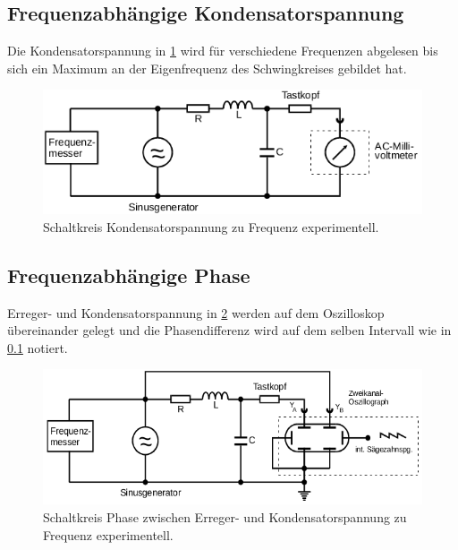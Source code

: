 \subsection{Frequenzabhängige Kondensatorspannung}
\label{sec:d3}
Die Kondensatorspannung in \ref{fig:d3} wird für verschiedene Frequenzen abgelesen bis sich ein
Maximum an der Eigenfrequenz des Schwingkreises gebildet hat.
\begin{figure}[H]
  \centering
  \includegraphics{content/images/d3.png}
  \caption{Schaltkreis Kondensatorspannung zu Frequenz experimentell.}
  \label{fig:d3}
\end{figure}

\subsection{Frequenzabhängige Phase}
Erreger- und Kondensatorspannung in \ref{fig:d4} werden auf dem Oszilloskop übereinander gelegt
und die Phasendifferenz wird auf dem selben Intervall wie in \ref{sec:d3} notiert.
\begin{figure}[H]
  \centering
  \includegraphics{content/images/d4.png}
  \caption{Schaltkreis Phase zwischen Erreger- und Kondensatorspannung zu Frequenz experimentell.}
  \label{fig:d4}
\end{figure}
